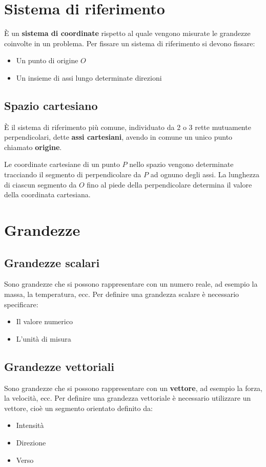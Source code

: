 \documentclass[a4paper]{article}
\theoremstyle{break}
\theoremstyle{break}
\theoremstyle{break}
\theoremstyle{break}
\begin{document}


\tableofcontents
\pagebreak

\section{Sistema di riferimento}
È un \textbf{sistema di coordinate} rispetto al quale vengono misurate le grandezze coinvolte in un problema.
Per fissare un sistema di riferimento si devono fissare:
\begin{itemize}
	\item Un punto di origine $O$
	\item Un insieme di assi lungo determinate direzioni
\end{itemize}

\subsection{Spazio cartesiano}
È il sistema di riferimento più comune, individuato da 2 o 3 rette mutuamente perpendicolari,
dette \textbf{assi cartesiani}, avendo in comune un unico punto chiamato \textbf{origine}.
\label{D1}
\begin{definition}
	Le coordinate cartesiane di un punto $P$ nello spazio vengono determinate tracciando il segmento
	di perpendicolare da \( P \) ad ognuno degli assi. La lunghezza di ciascun segmento da \( O \) fino al
	piede della perpendicolare determina il valore della coordinata cartesiana.
	\label{D2}
\end{definition}

\section{Grandezze}
\subsection{Grandezze scalari}
Sono grandezze che si possono rappresentare con un numero reale, ad esempio la massa, la temperatura, ecc.
Per definire una grandezza scalare è necessario specificare:
\begin{itemize}
	\item Il valore numerico
	\item L'unità di misura
\end{itemize}

\subsection{Grandezze vettoriali}
Sono grandezze che si possono rappresentare con un \textbf{vettore}, ad esempio la forza, la velocità, ecc.
Per definire una grandezza vettoriale è necessario utilizzare un vettore, cioè un segmento orientato
definito da:
\begin{itemize}
	\item Intensità
	\item Direzione
	\item Verso
\end{itemize}
\label{D3}
\end{document}
